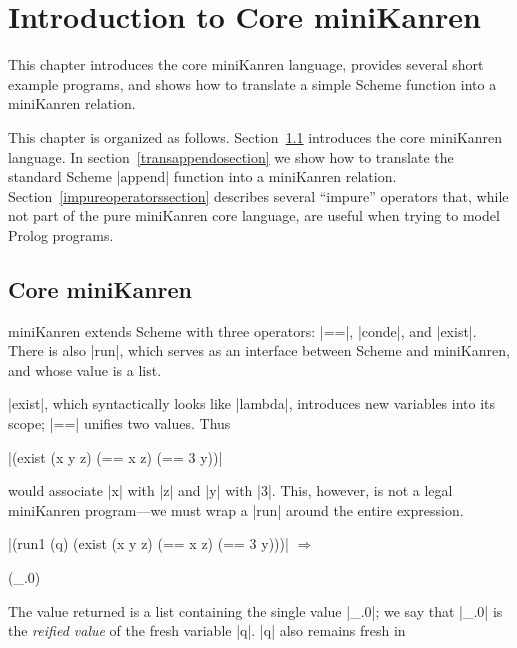 \chapter{Introduction to Core miniKanren}\label{mkintrochapter}

This chapter introduces the core miniKanren language, provides several
short example programs, and shows how to translate a simple Scheme
function into a miniKanren relation.

This chapter is organized as follows.  Section~\ref{coremksection}
introduces the core miniKanren language.  In
section~\ref{transappendosection} we show how to translate the
standard Scheme \scheme|append| function into a miniKanren relation.
Section~\ref{impureoperatorssection} describes several ``impure''
operators that, while not part of the pure miniKanren core language,
are useful when trying to model Prolog programs.

\section{Core miniKanren}\label{coremksection}

miniKanren extends Scheme with three operators: \scheme|==|,
\scheme|conde|, and \scheme|exist|. There is also \scheme|run|, which
serves as an interface between Scheme and miniKanren, and whose value
is a list.

\scheme|exist|, which syntactically looks like \scheme|lambda|,
introduces new variables into its scope; \scheme|==| unifies two
values.  Thus

\wspace

\noindent\scheme|(exist (x y z) (== x z) (== 3 y))|

\wspace

\noindent would associate \scheme|x| with \scheme|z| and \scheme|y|
with \scheme|3|.  This, however, is not a legal miniKanren
program---we must wrap a \scheme|run| around the entire expression.

\wspace

\noindent\scheme|(run1 (q) (exist (x y z) (== x z) (== 3 y)))| $\Rightarrow$ \begin{schemeresponsebox}(_.0)\end{schemeresponsebox}

\wspace

\noindent The value returned is a list containing the single value \schemeresult|_.0|;
we say that \schemeresult|_.0| is the \emph{reified value} of the fresh variable \scheme|q|.  \scheme|q| also remains fresh in

